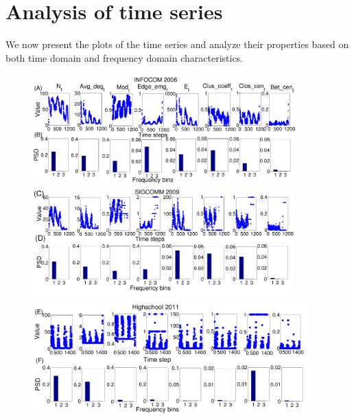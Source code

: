 \noindent
\section{Analysis of time series}
\label{properties}

We now present the plots of the time series and analyze their properties based on both time domain and frequency domain characteristics. 
\begin{figure}[!ht]
  \centering
  \includegraphics*[width=0.9\textwidth,angle=0]{./texfiles/Chapter_1/fig/infocom_all-eps-converted-to.pdf}
  
  
  
  
  \centering
  \includegraphics*[width=0.9\textwidth,angle=0]{./texfiles/Chapter_1/fig/sigcomm_all-eps-converted-to.pdf}
  
  \centering
  \includegraphics*[width=0.95\textwidth,angle=0]{./texfiles/Chapter_1/fig/highschool_2011_psd-eps-converted-to.pdf}
  

\end{figure}
